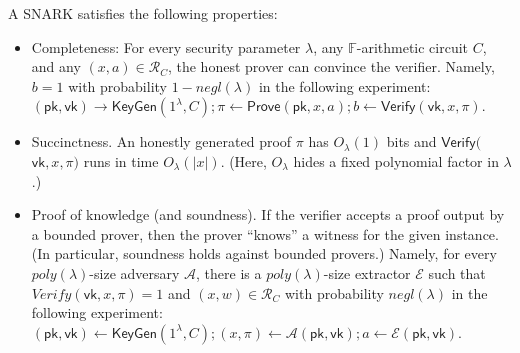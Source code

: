 A SNARK satisfies the following properties: 
\begin{itemize}
    \item Completeness: For every security parameter $\lambda$, any $\mathbb{F}$-arithmetic circuit $C$, and any $(x,a)\in\mathcal{R}_C$, the honest prover can convince the verifier. Namely, $b = 1$ with probability $1-negl(\lambda)$ in the following experiment: $(\mathsf{pk}, \mathsf{vk}) \to \mathsf{KeyGen}(1^{\lambda}, C); \pi \leftarrow \mathsf{Prove}(\mathsf{pk}, x, a); b \leftarrow \mathsf{Verify}(\mathsf{vk}, x, \pi)$.
    \item Succinctness. An honestly generated proof $\pi$ has $O_\lambda(1)$ bits and $\mathsf{Verify}($ $\mathsf{vk},x,\pi)$ runs in time $O_\lambda(|x|)$. (Here, $O_\lambda$ hides a fixed polynomial factor in $\lambda$.)
    \item Proof of knowledge (and soundness). If the verifier accepts a proof output by a bounded prover, then the prover “knows” a witness for the given instance. (In particular, soundness holds against bounded provers.) Namely, for every $poly(\lambda)$-size adversary $\mathcal{A}$, there is a $poly(\lambda)$-size extractor $\mathcal{E}$ such that $Verify(\mathsf{vk}, x, \pi) = 1$ and $(x, w) \in \mathcal{R}_C$ with probability $negl(\lambda)$ in the following experiment: $(\mathsf{pk}, \mathsf{vk}) \leftarrow \mathsf{KeyGen}(1^\lambda, C); (x, \pi) \leftarrow \mathcal{A}(\mathsf{pk}, \mathsf{vk}); a \leftarrow \mathcal{E}(\mathsf{pk}, \mathsf{vk})$.
\end{itemize}
